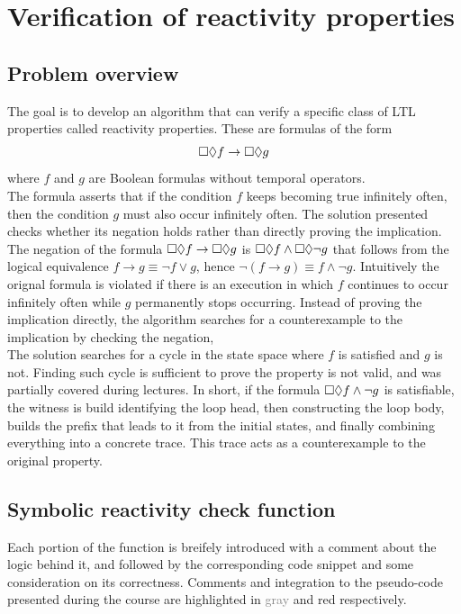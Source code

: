 \section*{Verification of reactivity properties}
\subsection*{Problem overview}
The goal is to develop an algorithm that can verify a specific class of LTL properties called reactivity properties. These are formulas of the form \[\square\lozenge f \rightarrow \square\lozenge g\] where \(f\) and \(g\) are Boolean formulas without temporal operators.\\[2ex]
The formula asserts that if the condition \(f\) keeps becoming true infinitely often, then the condition \(g\) must also occur infinitely often. The solution presented checks whether its negation holds rather than directly proving the implication.\\[2ex]
The negation of the formula \(\square\lozenge f \rightarrow \square\lozenge g\) is \(\square\lozenge f \wedge \square\lozenge \neg g\) that follows from the logical equivalence \(f \rightarrow g \equiv \neg f \lor g\), hence \(\neg (f \rightarrow g) \equiv f \land \neg g\). Intuitively the orignal formula is violated if there is an execution in which \(f\) continues to occur infinitely often while \(g\) permanently stops occurring. Instead of proving the implication directly, the algorithm searches for a counterexample to the implication by checking the negation, \\[2ex]
The solution searches for a cycle in the state space where \(f\) is satisfied and \(g\) is not. Finding such cycle is sufficient to prove the property is not valid, and was partially covered during lectures. In short, if the formula \(\square\lozenge f \wedge \lnot g\) is satisfiable, the witness is build identifying the loop head, then constructing the loop body, builds the prefix that leads to it from the initial states, and finally combining everything into a concrete trace. This trace acts as a  counterexample to the original property.

\subsection*{Symbolic reactivity check function}
Each portion of the function is breifely introduced with a comment about the logic behind it, and followed by the corresponding code snippet and some consideration on its correctness. Comments and integration to the pseudo-code presented during the course are highlighted in \textcolor{Gray}{gray} and \textcolor{BrickRed}{red} respectively.

